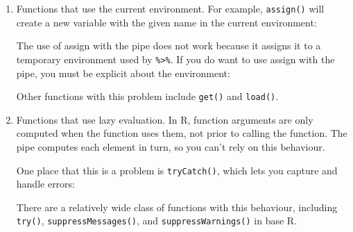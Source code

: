 \documentclass[]{book}
\newenvironment{Shaded}{\begin{snugshade}}{\end{snugshade}}
\newcommand{\KeywordTok}[1]{\textcolor[rgb]{0.13,0.29,0.53}{\textbf{{#1}}}}
\newcommand{\DataTypeTok}[1]{\textcolor[rgb]{0.13,0.29,0.53}{{#1}}}
\newcommand{\DecValTok}[1]{\textcolor[rgb]{0.00,0.00,0.81}{{#1}}}
\newcommand{\StringTok}[1]{\textcolor[rgb]{0.31,0.60,0.02}{{#1}}}
\newcommand{\CommentTok}[1]{\textcolor[rgb]{0.56,0.35,0.01}{\textit{{#1}}}}
\newcommand{\NormalTok}[1]{{#1}}
\begin{document}
\begin{enumerate}
\def\labelenumi{\arabic{enumi}.}
\item
  Functions that use the current environment. For example,
  \texttt{assign()} will create a new variable with the given name in
  the current environment:

\begin{Shaded}
\end{Shaded}

  The use of assign with the pipe does not work because it assigns it to
  a temporary environment used by \texttt{\%\textgreater{}\%}. If you do
  want to use assign with the pipe, you must be explicit about the
  environment:

\begin{Shaded}
\end{Shaded}

  Other functions with this problem include \texttt{get()} and
  \texttt{load()}.
\item
  Functions that use lazy evaluation. In R, function arguments are only
  computed when the function uses them, not prior to calling the
  function. The pipe computes each element in turn, so you can't rely on
  this behaviour.

  One place that this is a problem is \texttt{tryCatch()}, which lets
  you capture and handle errors:

\begin{Shaded}
\end{Shaded}

  There are a relatively wide class of functions with this behaviour,
  including \texttt{try()}, \texttt{suppressMessages()}, and
  \texttt{suppressWarnings()} in base R.
\end{enumerate}
\end{document}
